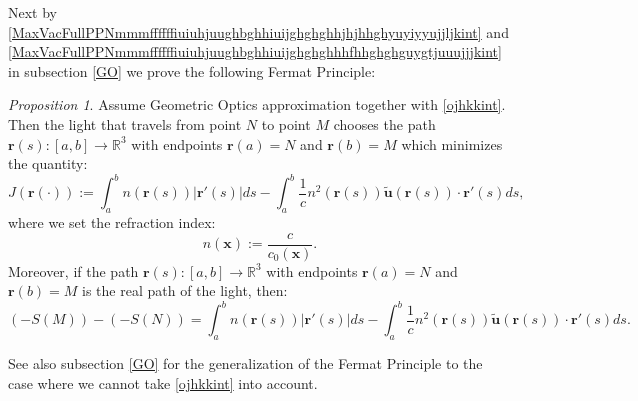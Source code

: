 \documentclass{article}
\newtheorem{proposition}{Proposition}[section]
\theoremstyle{definition}
\theoremstyle{remark}
\renewcommand{\vec}[1]{\mathbf{#1}}
\newcommand{\er}{\eqref}
\newcommand{\er}{\eqref}
\newtheorem{proposition}{Proposition}
\begin{document}
%
%
%
%
Next by
\er{MaxVacFullPPNmmmffffffiuiuhjuughbghhiuijghghghhjhjhhghyuyiyyujjljkint}
and
\er{MaxVacFullPPNmmmffffffiuiuhjuughbghhiuijghghghhhfhhghghguygtjuuujjjkint}
in subsection \ref{GO} we prove the following Fermat Principle:
\begin{proposition}\label{gughghfint}
Assume Geometric Optics approximation together with \er{ojhkkint}.
Then the light that travels from point $N$ to point $M$ chooses the
path $\vec r(s):[a,b]\to\mathbb{R}^3$ with endpoints $\vec r(a)=N$
and $\vec r(b)=M$ which minimizes the quantity:
\begin{equation}\label{MaxMedFullGGffgggyyojjhhjkhjyyiuhggjhhjhuyytytyuuytrrtghjtyuggyuighjuyioyyfgffhyuhhghzzrrkkhhkkkhhhjhkjhhghhgghint}
J\left(\vec r(\cdot)\right):=\int_a^bn\left(\vec
r(s)\right)\left|\vec r'(s)\right|ds-\int_a^b
\frac{1}{c}n^2\left(\vec r(s)\right)\vec {\tilde u}\left(\vec
r(s)\right)\cdot\vec r'(s)ds,
\end{equation}
where we set the refraction index:
\begin{equation}\label{MaxMedFullGGffgggyyojjhhjkhjyyiuhggjhhjhuyytytyuuytrrtghjtyuggyuighjuyioyyfgffhyuhhghzzrrkkhhkkkhhhjhkjhhghhgghiuiu1int}
n\left(\vec x\right):=\frac{c}{c_0\left(\vec x\right)}.
\end{equation}
Moreover, if the path $\vec r(s):[a,b]\to\mathbb{R}^3$ with
endpoints $\vec r(a)=N$ and $\vec r(b)=M$ is the real path of the
light, then:
\begin{equation}\label{MaxMedFullGGffgggyyojjhhjkhjyyiuhggjhhjhuyytytyuuytrrtghjtyuggyuighjuyioyyfgffhyuhhghzzrrkkhhkkkint}
\left(-S(M)\right)- \left(-S(N)\right)=\int_a^bn\left(\vec
r(s)\right)\left|\vec r'(s)\right|ds-\int_a^b
\frac{1}{c}n^2\left(\vec r(s)\right)\vec {\tilde u}\left(\vec
r(s)\right)\cdot\vec r'(s)ds.
\end{equation}
\end{proposition}
See also subsection \ref{GO} for the generalization of the Fermat
Principle to the case where we cannot take \er{ojhkkint} into
account.
\end{document}
